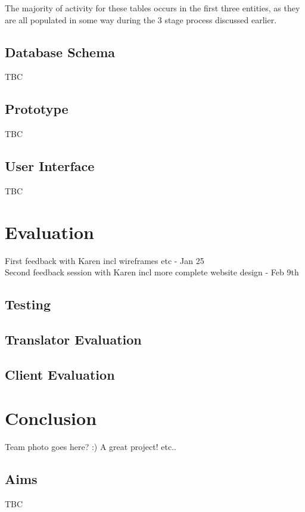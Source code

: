 \documentclass{l3proj}
\begin{document}
The majority of activity for these tables occurs in the first three entities, as they are all populated in some way during the 3 stage process discussed earlier.

\section{Database Schema}
TBC

\section{Prototype}
TBC

\section{User Interface}
TBC

\chapter{Evaluation}

First feedback with Karen incl wireframes etc - Jan 25\\
Second feedback session with Karen incl more complete website design - Feb 9th

\section{Testing}

\section{Translator Evaluation}

\section{Client Evaluation}

\chapter{Conclusion}

Team photo goes here? :)
A great project! etc..

\section{Aims}
TBC
\end{document}
